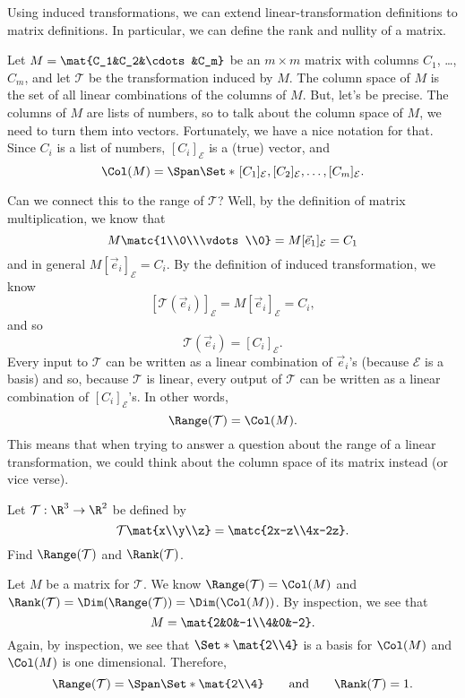 Using induced transformations, we can extend linear-transformation definitions to matrix definitions.
In particular, we can define the rank and nullity of a matrix.


Let $M=\mat{C_1&C_2&\cdots &C_m}$ be an $m\times m$ matrix with columns $C_1$, \ldots, $C_m$, and let $\mathcal T$ be 
the transformation induced by $M$. The column space of $M$ is the set of all linear combinations of the columns of
$M$. But, let's be precise. The columns of $M$ are lists of numbers, so to talk about the column space of $M$,
we need to turn them into vectors. Fortunately, we have a nice notation for that. Since $C_i$ is a list of numbers,
$[C_i]_{\mathcal E}$ is a (true) vector, and
\[
	\Col(M)=\Span\Set*{\hspace{1pt}[C_1]_{\mathcal E},[C_2]_{\mathcal E},\ldots,[C_m]_{\mathcal E}}.
\]

Can we connect this to the range of $\mathcal T$? Well, by the definition of matrix multiplication, we know that
\[
	M\matc{1\\0\\\vdots\\0}=M[\vec e_1]_{\mathcal E} = C_1
\]
and in general $M[\vec e_i]_{\mathcal E}=C_i$. By the definition of induced transformation, we know
\[
	[\mathcal T(\vec e_i)]_{\mathcal E} = M[\vec e_i]_{\mathcal E} = C_i,
\]
and so
\[
	\mathcal T(\vec e_i)= [C_i]_{\mathcal E}.
\]
Every input to $\mathcal T$ can be written as a linear combination of $\vec e_i$'s (because $\mathcal E$ is a basis)
and so, because $\mathcal T$ is linear, every output of $\mathcal T$ can be written as a linear combination of $[C_i]_{\mathcal E}$'s.
In other words,
\[
	\Range(\mathcal T)=\Col(M).
\]
This means that when trying to answer a question about the range of a linear transformation, we could think about
the column space of its matrix instead (or vice verse). 

\begin{example}
	Let $\mathcal T:\R^3\to\R^2$ be defined by
	\[
		\mathcal T\mat{x\\y\\z} = \matc{2x-z\\4x-2z}.
	\]
	Find $\Range(\mathcal T)$ and $\Rank(\mathcal T)$.

	\medskip
	Let $M$ be a matrix for $\mathcal T$. We know $\Range(\mathcal T)=\Col(M)$ and $\Rank(\mathcal T)=\Dim(\Range(\mathcal T))
	=\Dim(\Col(M))$. By inspection, we see that
	\[
		M=\mat{2&0&-1\\4&0&-2}.
	\]
	Again, by inspection, we see that $\Set*{\mat{2\\4}}$ is a basis for $\Col(M)$ and $\Col(M)$ is one dimensional.
	Therefore,
	\[
		\Range(\mathcal T) = \Span\Set*{\mat{2\\4}}\qquad \text{and}\qquad \Rank(\mathcal T)=1.
	\]
\end{example}

